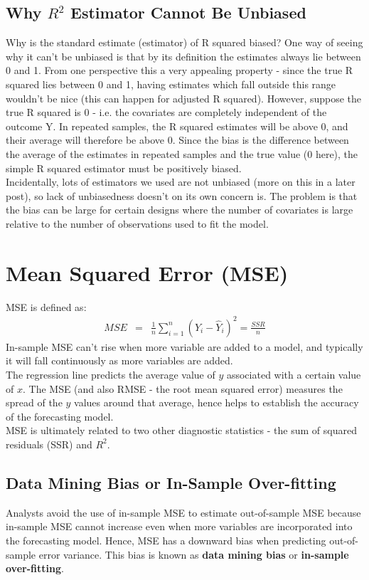 \subsection{Why \texorpdfstring{$R^{2}$}{R2} Estimator Cannot Be Unbiased}
Why is the standard estimate (estimator) of R squared biased? One way of seeing why it can't be unbiased is that by its definition the estimates always lie between 0 and 1. From one perspective this a very appealing property - since the true R squared lies between 0 and 1, having estimates which fall outside this range wouldn't be nice (this can happen for adjusted R squared). However, suppose the true R squared is 0 - i.e. the covariates are completely independent of the outcome Y. In repeated samples, the R squared estimates will be above 0, and their average will therefore be above 0. Since the bias is the difference between the average of the estimates in repeated samples and the true value (0 here), the simple R squared estimator must be positively biased.\\
Incidentally, lots of estimators we used are not unbiased (more on this in a later post), so lack of unbiasedness doesn't on its own concern is. The problem is that the bias can be large for certain designs where the number of covariates is large relative to the number of observations used to fit the model.


\section{Mean Squared Error (MSE)}
MSE is defined as:
\begin{eqnarray}
MSE &=& \frac{1}{n}\sum_{i = 1}^{n}\left(Y_{i} - \hat{Y}_{i}\right)^{2} = \frac{SSR}{n}
\end{eqnarray}
In-sample MSE can't rise when more variable are added to a model, and typically it will fall continuously as more variables are added.\\
The regression line predicts the average value of $y$ associated with a certain value of $x$. The MSE (and also RMSE - the root mean squared error) measures the spread of the $y$ values around that average, hence helps to establish the accuracy of the forecasting model.\\
MSE is ultimately related to two other diagnostic statistics - the sum of squared residuals (SSR) and $R^{2}$.

\subsection{Data Mining Bias or In-Sample Over-fitting}
Analysts avoid the use of in-sample MSE to estimate out-of-sample MSE because in-sample MSE cannot increase even when more variables are incorporated into the forecasting model. Hence, MSE has a downward bias when predicting out-of-sample error variance. This bias is known as \textbf{\color{blue}data mining bias} or \textbf{\color{blue}in-sample over-fitting}.

